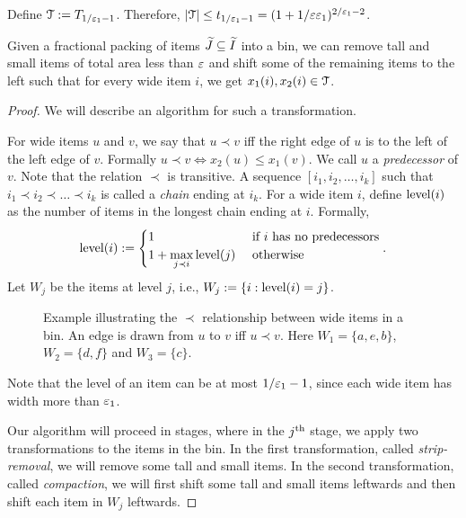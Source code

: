 Define $\mathcal{T} := T_{1/\varepsilon_1-1}$.
Therefore, $|\mathcal{T}| \le t_{1/\varepsilon_1-1} = (1+1/\varepsilon\varepsilon_1)^{2/\varepsilon_1 - 2}$.

\begin{lemma}
\label{thm:disc-hor-pos}
Given a fractional packing of items $\widetilde{J} \subseteq \widetilde{I}$ into a bin,
we can remove tall and small items of total area less than $\varepsilon$
and shift some of the remaining items to the left such that for every wide item $i$,
we get $x_1(i), x_2(i) \in \mathcal{T}$.
\end{lemma}
\begin{proof}
We will describe an algorithm for such a transformation.

For wide items $u$ and $v$, we say that $u \prec v$ iff
the right edge of $u$ is to the left of the left edge of $v$.
Formally $u \prec v \iff x_2(u) \le x_1(v)$.
We call $u$ a \emph{predecessor} of $v$.
Note that the relation $\prec$ is transitive.
A sequence $[i_1, i_2, \ldots, i_k]$ such that $i_1 \prec i_2 \prec \ldots \prec i_k$
is called a \emph{chain} ending at $i_k$.
For a wide item $i$, define $\operatorname{level}(i)$ as the number of items in the longest chain
ending at $i$. Formally,
\[ \operatorname{level}(i) := \begin{cases}
1 & \textrm{ if } i \textrm{ has no predecessors}
\\ \displaystyle 1 + \max_{j \prec i} \operatorname{level}(j) & \textrm{ otherwise}
\end{cases}. \]
Let $W_j$ be the items at level $j$, i.e., $W_j := \{i: \operatorname{level}(i) = j\}$.

\begin{figure}[htb]
\centering

\caption[Relation $\prec$ among items in a bin]%
{Example illustrating the $\prec$ relationship between wide items in a bin.
An edge is drawn from $u$ to $v$ iff $u \prec v$.
Here $W_1 = \{a, e, b\}$, $W_2 = \{d, f\}$ and $W_3 = \{c\}$.}
\label{fig:precedence-graph}
\end{figure}

Note that the level of an item can be at most $1/\varepsilon_1-1$,
since each wide item has width more than $\varepsilon_1$.

Our algorithm will proceed in stages, where in the $j^{\textrm{th}}$ stage,
we apply two transformations to the items in the bin.
In the first transformation, called \emph{strip-removal},
we will remove some tall and small items.
In the second transformation, called \emph{compaction},
we will first shift some tall and small items leftwards
and then shift each item in $W_j$ leftwards.


\end{proof}
